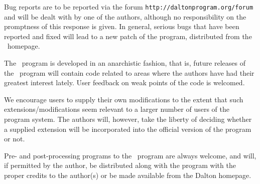 Bug reports are to be reported via the forum \verb|http://daltonprogram.org/forum| and
will be dealt with by one of the authors, although no responsibility
on the promptness of this response is given. In general, serious bugs
that have been
reported and fixed will lead to a new patch of the program, distributed from the
\dalton\ homepage.

The \dalton\ program is developed in an anarchistic fashion, that is,
future releases of the \dalton\ program will contain code related to
areas where the authors have had their greatest interest
lately. User feedback on weak points of the code is welcomed.

We encourage users to supply their own
modifications to the extent that
such extensions/modifications seem relevant to a larger number of
users of the program system. The authors will, however, take the
liberty of deciding whether a supplied extension will be incorporated
into the official version of the program or not.

Pre- and post-processing programs to the \dalton\ program are always
welcome, and will, if permitted by the author, be distributed along
with the program with the proper credits to the
author(s) or be made available from the Dalton homepage.
